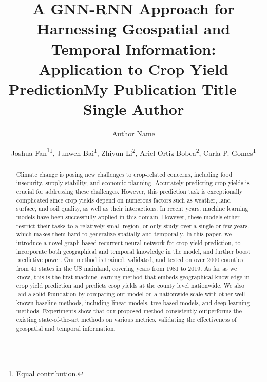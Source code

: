 \documentclass[letterpaper]{article} %
\title{A GNN-RNN Approach for Harnessing Geospatial and Temporal Information:\\  Application to  Crop Yield Prediction}
\title{My Publication Title --- Single Author}
\author {
    Author Name
}
\author{
    Joshua Fan\thanks{Equal contribution.}\textsuperscript{\rm 1}, Junwen Bai\footnotemark[1]\textsuperscript{\rm 1},  Zhiyun Li\footnotemark[1]\textsuperscript{\rm 2},  Ariel Ortiz-Bobea\textsuperscript{\rm 2}, Carla P. Gomes\textsuperscript{\rm 1}\\
}
\begin{document}
\maketitle

\begin{abstract}
Climate change is posing new challenges to crop-related concerns, including food insecurity, supply stability, and economic planning. Accurately predicting crop yields is crucial for addressing these challenges. However, this prediction task is exceptionally complicated since crop yields depend on numerous factors such as weather, land surface, and soil quality, as well as their interactions. In recent years, machine learning models have been successfully applied in this domain. However, these models either restrict their tasks to a relatively small region, or only study over a single or few years, which makes them hard to generalize spatially and temporally. In this paper, we introduce a novel graph-based recurrent neural network for crop yield prediction, to incorporate both geographical and temporal knowledge in the model, and further boost predictive power. Our method is trained, validated, and tested on over 2000 counties from 41 states in the US mainland, covering years from 1981 to 2019. As far as we know, this is the first machine learning method that embeds geographical knowledge in crop yield prediction and predicts crop yields at the county level nationwide. We also laid a solid foundation by comparing our model on a nationwide scale with other well-known baseline methods, including linear models, tree-based models, and deep learning methods. Experiments show that our proposed method consistently outperforms the existing state-of-the-art methods on various metrics, validating the effectiveness of geospatial and temporal information.


\end{abstract}
\end{document}
